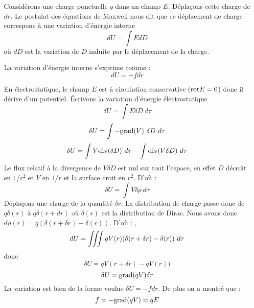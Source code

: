 \documentclass[12pt]{book}
\begin{document}
Consid\'erons une charge ponctuelle $q$ dans un champ $E$. D\'epla\c
cons cette charge de $dr$. Le postulat des \'equations de Maxwell nous
dit que ce d\'eplaement de charge correspons \`a une variation
d'\'energie interne 
\begin{equation}
dU=\int EdD
\end{equation}
o\`u $dD$ est la variation de $D$ induite par le d\'eplacement de la
charge.
\begin{thm}
La variation d'\'energie interne s'exprime comme :
\begin{equation}
dU=-f dr
\end{equation}
\end{thm}
\begin{pf}
\small
En \'electrostatique, le champ $E$ est \`a circulation conservative (${\rm rot}
E=0$) donc il d\'erive d'un potentiel.
\medskip
\'Ecrivons la variation d'\'energie \'electrostatique\cite{ph:elect:Fournet}
\begin{equation}
\delta U=\int E\delta D \ d\tau
\end{equation}
\begin{equation}
\delta U=\int- \grad (V)\ \delta D \ d\tau
\end{equation}
\begin{equation}
\delta U=\int V {\rm div}(\delta D) \ d\tau-\int {\rm div}(V\delta D)\  d\tau
\end{equation}
Le flux relatif \`a la divergence de $V\delta D$ est nul sur tout
l'espace, en effet $D$ d\'ecro\^\i t en $1/r^2$ et $V$ en $1/r$ et la surface
croit en $r^2$. D'o\`u :
\begin{equation}
\delta U=\int V \delta \rho \ d\tau
\end{equation}
D\'epla\c cons une charge de la quantit\'e $\delta r$. La distribution de
charge passe donc de $q\delta(r)$ \`a $q\delta(r+dr)$ o\`u
$\delta(r)$ est la distribution de Dirac. Nous avons donc $d
\rho(r)=q(\delta(r+\delta r)-\delta(r))$. D'o\`u :
,\begin{equation}
dU=\int\!\!\!\int\!\!\!\int qV(r)(\delta(r+\delta r)-\delta(r)) \ d\tau
\end{equation}
donc
\begin{equation}
\delta U=qV(r+\delta r)-qV(r))
\end{equation}
\begin{equation}
\delta U={\rm grad}(qV)\delta r
\end{equation}
La variation est bien de la forme voulue $\delta U=-fdr$. De plus on a
montr\'e que :
\begin{equation}
f=-{\rm grad}(qV)=qE
\end{equation}    
\end{pf}
\end{document}
